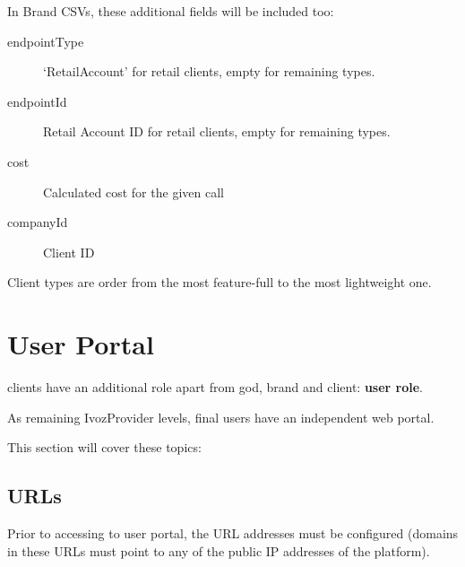 \documentclass[letterpaper,10pt,english]{sphinxmanual}
\begin{document}
In Brand CSVs, these additional fields will be included too:
\begin{description}
\item[{endpointType}] \leavevmode{}\label{administration_portal/client/wholesale/calls/call_csv_schedulers:term-endpointtype}
`RetailAccount' for retail clients, empty for remaining types.

\item[{endpointId}] \leavevmode{}\label{administration_portal/client/wholesale/calls/call_csv_schedulers:term-endpointid}
Retail Account ID for retail clients, empty for remaining types.

\item[{cost}] \leavevmode{}\label{administration_portal/client/wholesale/calls/call_csv_schedulers:term-cost}
Calculated cost for the given call

\item[{companyId}] \leavevmode{}\label{administration_portal/client/wholesale/calls/call_csv_schedulers:term-companyid}
Client ID

\end{description}

Client types are order from the most feature-full to the most lightweight one.


\chapter{User Portal}
\label{user_portal/index:userportal}\label{user_portal/index:user-portal}\label{user_portal/index::doc}
{\hyperref[administration_portal/brand/clients/virtual_pbx:virtual\string-pbx]{}} clients have an additional role apart from god, brand and client: \textbf{user role}.

As remaining IvozProvider levels, final users have an independent web portal.

This section will cover these topics:


\section{URLs}
\label{user_portal/urls::doc}\label{user_portal/urls:urls}
Prior to accessing to user portal, the URL addresses must be configured (domains
in these URLs must point to any of the public IP addresses of the platform).
\end{document}

